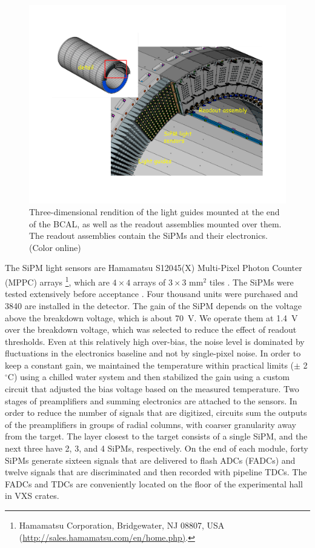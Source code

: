 \begin{figure}[tbp]\centering
\includegraphics[scale=0.4]{figures/bcal_assemblies.pdf}
\caption{\label{fig:bcal:bcal_assemblies}
   Three-dimensional rendition of the light guides mounted at the end of the 
   BCAL, as well as the readout assemblies mounted over them. The 
   readout assemblies contain the 
   SiPMs and their electronics.  (Color online)
  }
\end{figure}


The SiPM light sensors are Hamamatsu S12045(X) Multi-Pixel Photon Counter (MPPC) arrays \footnote{Hamamatsu Corporation, Bridgewater, NJ 08807, USA \\ (\url{http://sales.hamamatsu.com/en/home.php)}.}, 
which are $4\times4$ arrays of $3\times3$ mm$^2$ tiles \cite{hdnote2913}. The SiPMs were tested extensively before acceptance \cite{Barbosa2012100,Qiang2013234,soto,Soto201489,BeattieIEEE,doi:10.1063/1.4955340}. Four thousand units were purchased and 3840 are installed in the detector. The gain of the SiPM depends on the voltage above the breakdown voltage, which is about 70~V. We operate them at 1.4~V over the breakdown voltage, which was selected to reduce the effect of readout thresholds. Even at this relatively high over-bias, the noise level is dominated by fluctuations in the electronics baseline and not by single-pixel noise. In order to keep a constant gain, we maintained the temperature within practical limits ($\pm$ 2$^\circ$C) using a chilled water system and then stabilized the gain using a custom circuit that adjusted the bias voltage based on the measured temperature. Two stages of preamplifiers and summing electronics are attached to the sensors. In order to reduce the number of signals that are digitized, circuits sum the outputs of the preamplifiers in groups of radial columns, with coarser granularity away from the target. The layer closest to the target consists of a single SiPM, and the next three have 2, 3, and 4 SiPMs, respectively. On the end of each module, forty SiPMs generate sixteen signals that are delivered to flash ADCs (FADCs) and twelve signals that are discriminated and then recorded with pipeline TDCs. The FADCs and TDCs are conveniently located on the floor of the experimental hall in VXS crates.

